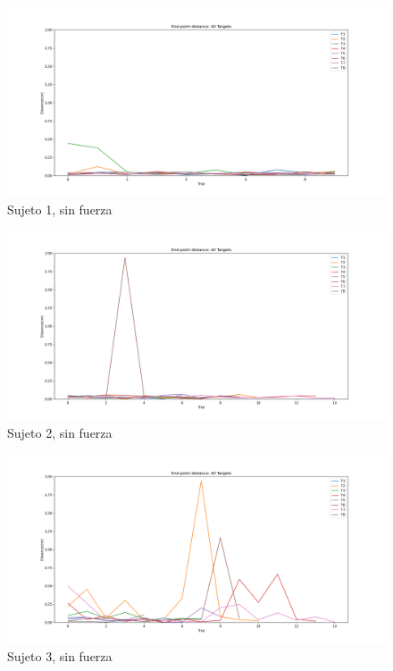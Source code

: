 \documentclass[a4paper,11pt, oneside]{book}
\begin{document}
\begin{figure}[H]
	\includegraphics[width=\linewidth]{sujeto1/no_force/evolution_distance}
	\caption{Sujeto 1, sin fuerza}
	\label{1-1-2}
\end{figure}
\begin{figure}[H]
	\centering
	\includegraphics[width=\linewidth]{sujeto2/no_force/evolution_distance}
	\caption{Sujeto 2, sin fuerza}
	\label{2-1-2}
\end{figure}
\begin{figure}[H]
	\centering
	\includegraphics[width=\linewidth]{sujeto3/no_force/evolution_distance}
	\caption{Sujeto 3, sin fuerza}
	\label{3-1-2}
\end{figure}
\end{document}
